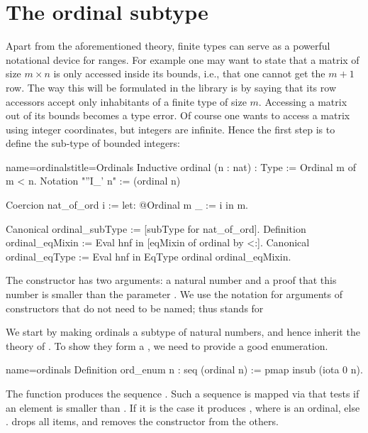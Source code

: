 \section{The ordinal subtype}\label{sec:ordfintype}

Apart from the aforementioned theory, finite types can serve as a
powerful notational device for ranges.  For example one may want
to state that a matrix of size $m \times n$ is only accessed inside
its bounds, i.e., that one cannot get the $m+1$ row.  The way this will
be formulated in the \mcbMC{} library is by saying that its row
accessors accept only inhabitants of a finite type of size $m$.
Accessing a matrix out of its bounds becomes a type error.
Of course one wants to access a matrix using integer coordinates, but
integers are infinite.  Hence the first step is to define the sub-type
of bounded integers:

\begin{coq}{name=ordinals}{title=Ordinals}
Inductive ordinal (n : nat) : Type := Ordinal m of m < n.
Notation "''I_' n" := (ordinal n)

Coercion nat_of_ord i := let: @Ordinal m _ := i in m.

Canonical ordinal_subType := [subType for nat_of_ord].
Definition ordinal_eqMixin := Eval hnf in [eqMixin of ordinal by <:].
Canonical ordinal_eqType := Eval hnf in EqType ordinal ordinal_eqMixin.
\end{coq}
The constructor  has two arguments: a natural number 
and a proof that this number is smaller than the parameter . We
use the  notation for arguments of constructors that do not need
to be named; thus  stands for


We start by making ordinals a subtype of natural numbers, and hence
inherit the theory of .  To show they form a ,
we need to provide a good enumeration.

\begin{coq}{name=ordinals}{}
Definition ord_enum n : seq (ordinal n) := pmap insub (iota 0 n).
\end{coq}

The  function produces the sequence \C{[:: 0; 1; ...; n.-1]}.
Such a sequence is mapped via  that tests if an element 
is smaller than .  If it is the case it produces ,
where  is an ordinal, else .   drops all 
items, and removes the  constructor from the others.


